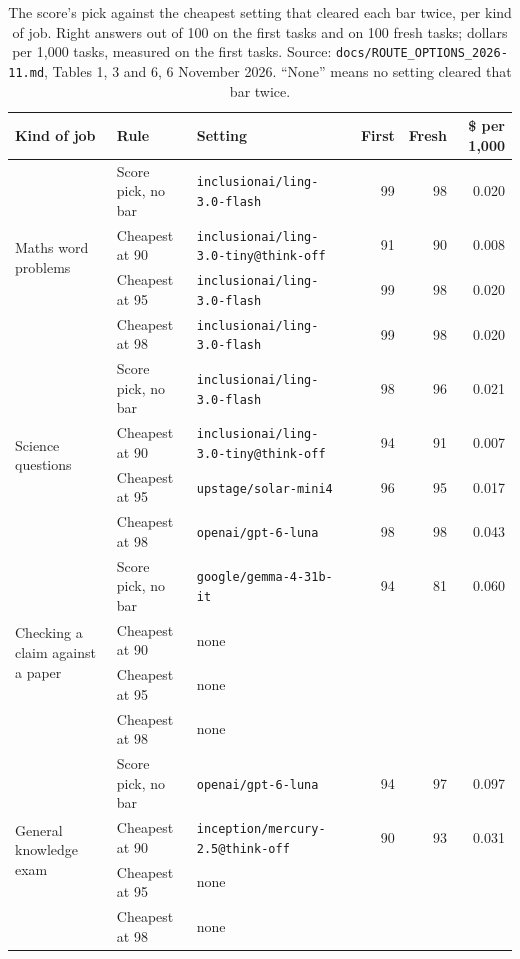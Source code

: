 \begin{table}[h]
\centering
\caption{The score's pick against the cheapest setting that cleared each bar twice, per kind of job. Right answers out of 100 on the first tasks and on 100 fresh tasks; dollars per 1{,}000 tasks, measured on the first tasks. Source: \texttt{docs/ROUTE\_OPTIONS\_2026-11.md}, Tables 1, 3 and 6, 6 November 2026. ``None'' means no setting cleared that bar twice.}
\label{tab:november_2026}
\footnotesize
\setlength{\tabcolsep}{4pt}
\begin{tabular}{p{2.3cm}llrrr}
\toprule
\textbf{Kind of job} & \textbf{Rule} & \textbf{Setting} & \textbf{First} & \textbf{Fresh} & \textbf{\$ per 1,000} \\
\midrule
\multirow{4}{2.3cm}{Maths word problems} & Score pick, no bar & \texttt{inclusionai/ling-3.0-flash} & 99 & 98 & 0.020 \\
 & Cheapest at 90 & \texttt{inclusionai/ling-3.0-tiny@think-off} & 91 & 90 & 0.008 \\
 & Cheapest at 95 & \texttt{inclusionai/ling-3.0-flash} & 99 & 98 & 0.020 \\
 & Cheapest at 98 & \texttt{inclusionai/ling-3.0-flash} & 99 & 98 & 0.020 \\
\midrule
\multirow{4}{2.3cm}{Science questions} & Score pick, no bar & \texttt{inclusionai/ling-3.0-flash} & 98 & 96 & 0.021 \\
 & Cheapest at 90 & \texttt{inclusionai/ling-3.0-tiny@think-off} & 94 & 91 & 0.007 \\
 & Cheapest at 95 & \texttt{upstage/solar-mini4} & 96 & 95 & 0.017 \\
 & Cheapest at 98 & \texttt{openai/gpt-6-luna} & 98 & 98 & 0.043 \\
\midrule
\multirow{4}{2.3cm}{Checking a claim against a paper} & Score pick, no bar & \texttt{google/gemma-4-31b-it} & 94 & 81 & 0.060 \\
 & Cheapest at 90 & none & & & \\
 & Cheapest at 95 & none & & & \\
 & Cheapest at 98 & none & & & \\
\midrule
\multirow{4}{2.3cm}{General knowledge exam} & Score pick, no bar & \texttt{openai/gpt-6-luna} & 94 & 97 & 0.097 \\
 & Cheapest at 90 & \texttt{inception/mercury-2.5@think-off} & 90 & 93 & 0.031 \\
 & Cheapest at 95 & none & & & \\
 & Cheapest at 98 & none & & & \\
\bottomrule
\end{tabular}
\end{table}

